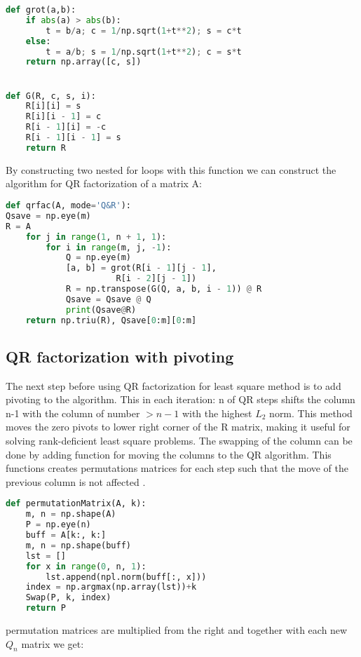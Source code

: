 \documentclass[a4paper]{article}
\begin{document}
\begin{lstlisting}[language=Python]
def grot(a,b):
    if abs(a) > abs(b):
        t = b/a; c = 1/np.sqrt(1+t**2); s = c*t
    else:
        t = a/b; s = 1/np.sqrt(1+t**2); c = s*t
    return np.array([c, s])


def G(R, c, s, i):
    R[i][i] = s
    R[i][i - 1] = c
    R[i - 1][i] = -c
    R[i - 1][i - 1] = s
    return R
\end{lstlisting}

By constructing two nested for loops with this function we can construct the algorithm for QR factorization of a matrix A: 

\begin{lstlisting}[language=Python]
def qrfac(A, mode='Q&R'):
Qsave = np.eye(m)
R = A
    for j in range(1, n + 1, 1):
        for i in range(m, j, -1):
            Q = np.eye(m)
            [a, b] = grot(R[i - 1][j - 1],
	                  R[i - 2][j - 1])
            R = np.transpose(G(Q, a, b, i - 1)) @ R
            Qsave = Qsave @ Q
            print(Qsave@R)
    return np.triu(R), Qsave[0:m][0:m]
\end{lstlisting}


\subsection{QR factorization with pivoting}
The next step before using QR factorization for least square method is to add pivoting to the algorithm. This in each iteration: n of  QR steps  shifts the column n-1 with the column of number $>n-1$  with the highest $L_2$ norm. This method moves the zero pivots to lower right corner of the R matrix, making it useful for solving rank-deficient least square problems. The swapping of the column can be done by adding function for moving the columns to the QR algorithm. This functions creates permutations matrices for each step such that the move of the previous column is not affected \citep{lecnotes}. 

\begin{lstlisting}[language=Python]
def permutationMatrix(A, k):
    m, n = np.shape(A)
    P = np.eye(n)
    buff = A[k:, k:]
    m, n = np.shape(buff)
    lst = []
    for x in range(0, n, 1):
        lst.append(npl.norm(buff[:, x]))
    index = np.argmax(np.array(lst))+k
    Swap(P, k, index)
    return P
\end{lstlisting}

permutation matrices are multiplied from the right and together with each new $Q_n$ matrix we get:  
\end{document}
